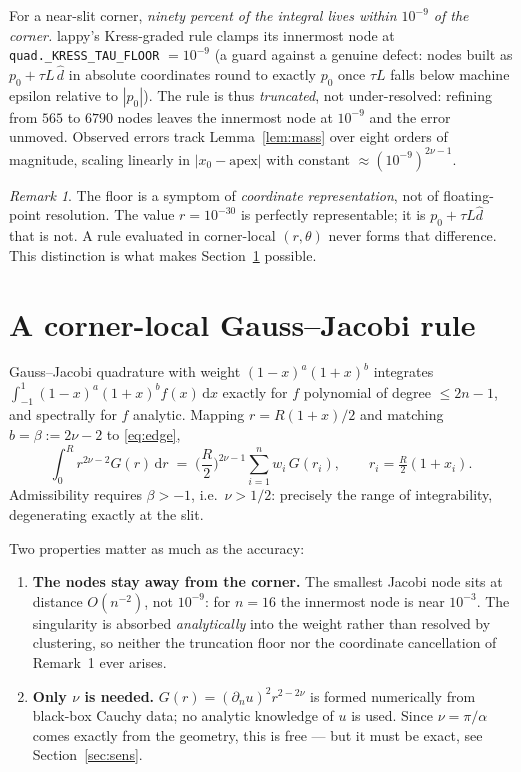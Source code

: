 \documentclass[11pt]{article}
\theoremstyle{remark}
\newtheorem{remark}{Remark}
\newcommand{\dd}{\,\mathrm{d}}
\begin{document}
\noindent
For a near-slit corner, \emph{ninety percent of the integral lives within
$10^{-9}$ of the corner.} lappy's Kress-graded rule clamps its innermost node at
\verb|quad._KRESS_TAU_FLOOR| $=10^{-9}$ (a guard against a genuine defect: nodes
built as $p_0+\tau L\,\hat{d}$ in absolute coordinates round to exactly $p_0$
once $\tau L$ falls below machine epsilon relative to $|p_0|$). The rule is thus
\emph{truncated}, not under-resolved: refining from $565$ to $6790$ nodes leaves
the innermost node at $10^{-9}$ and the error unmoved. Observed errors track
Lemma~\ref{lem:mass} over eight orders of magnitude, scaling linearly in
$|x_0-\text{apex}|$ with constant $\approx(10^{-9})^{2\nu-1}$.

\begin{remark}
The floor is a symptom of \emph{coordinate representation}, not of floating-point
resolution. The value $r=10^{-30}$ is perfectly representable; it is
$p_0 + \tau L\hat d$ that is not. A rule evaluated in corner-local $(r,\theta)$
never forms that difference. This distinction is what makes
Section~\ref{sec:jacobi} possible.
\end{remark}

\section{A corner-local Gauss--Jacobi rule}\label{sec:jacobi}

Gauss--Jacobi quadrature with weight $(1-x)^{a}(1+x)^{b}$ integrates
$\int_{-1}^{1}(1-x)^a(1+x)^b f(x)\dd x$ exactly for $f$ polynomial of degree
$\le2n-1$, and spectrally for $f$ analytic. Mapping $r=R(1+x)/2$ and matching
$b=\beta:=2\nu-2$ to \eqref{eq:edge},
\begin{equation}\label{eq:jacobi}
  \int_0^R r^{2\nu-2}G(r)\dd r
  \;=\;\Big(\frac R2\Big)^{\!2\nu-1}\sum_{i=1}^{n} w_i\, G(r_i),
  \qquad r_i=\tfrac R2(1+x_i).
\end{equation}
Admissibility requires $\beta>-1$, i.e.\ $\nu>1/2$: precisely the range of
integrability, degenerating exactly at the slit.

Two properties matter as much as the accuracy:
\begin{enumerate}
\item \textbf{The nodes stay away from the corner.} The smallest Jacobi node
sits at distance $O(n^{-2})$, not $10^{-9}$: for $n=16$ the innermost node is
near $10^{-3}$. The singularity is absorbed \emph{analytically} into the weight
rather than resolved by clustering, so neither the truncation floor nor the
coordinate cancellation of Remark~1 ever arises.
\item \textbf{Only $\nu$ is needed.} $G(r)=(\partial_n u)^2 r^{2-2\nu}$ is formed
numerically from black-box Cauchy data; no analytic knowledge of $u$ is used.
Since $\nu=\pi/\alpha$ comes exactly from the geometry, this is free --- but it
must be exact, see Section~\ref{sec:sens}.
\end{enumerate}
\end{document}
